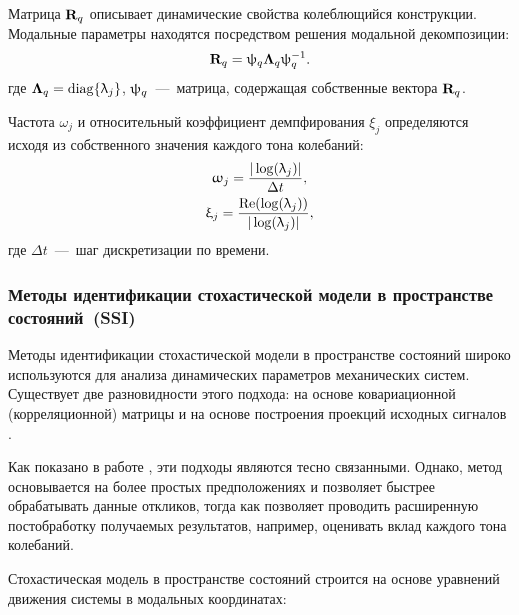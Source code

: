 Матрица $ \mathbf{R}_q $ описывает динамические свойства колеблющийся конструкции. Модальные параметры находятся посредством решения модальной декомпозиции:
\begin{equation}
	\mathbf{R}_q = \uppsi_q \mathbf{\Lambda}_q \uppsi_q^{-1}.
\end{equation}
где $ \mathbf{\Lambda}_q = \operatorname{diag} \{ \uplambda_j \} $, $ \mathbf{\uppsi}_q $~---~матрица, содержащая собственные вектора $ \mathbf{R}_q $.

Частота $ \omega_j $ и относительный коэффициент демпфирования $ \xi_j $ определяются исходя из собственного значения каждого тона колебаний:
\begin{equation}
	\begin{gathered}
		\upomega_j = \frac{|\log(\uplambda_j)|}{\Delta t}, \\
		\upxi_j = \frac{\operatorname{Re}(\log(\uplambda_j))}{|\log(\uplambda_j)|},
	\end{gathered}
\end{equation}
где $ \Delta t $~---~шаг дискретизации по времени.

\subsubsection{Методы идентификации стохастической модели в пространстве состояний~(SSI)}

Методы идентификации стохастической модели в пространстве состояний широко используются для анализа динамических параметров механических систем. Существует две разновидности этого подхода: на основе ковариационной (корреляционной) матрицы  и на основе построения проекций исходных сигналов  \cite{lib:oma:Rainieri}. 

Как показано в работе \cite{lib:oma:Peeters}, эти подходы являются тесно связанными. Однако, метод  основывается на более простых предположениях и позволяет быстрее обрабатывать данные откликов, тогда как  позволяет проводить расширенную постобработку получаемых результатов, например, оценивать вклад каждого тона колебаний.

Стохастическая модель в пространстве состояний строится на основе уравнений движения системы в модальных координатах:

